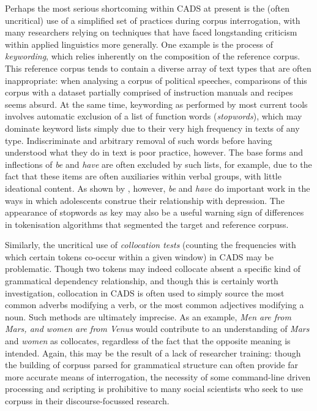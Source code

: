 Perhaps the most serious shortcoming within \gls{CADS} at present is the (often uncritical) use of a simplified set of practices during \gls{corpus} interrogation, with many researchers relying on techniques that have faced longstanding criticism within applied linguistics more generally. One example is the process of \emph{keywording}, which relies inherently on the composition of the reference \gls{corpus}. This reference \gls{corpus} tends to contain a diverse array of text types that are often inappropriate: when analysing a \gls{corpus} of political speeches, comparisons of this \gls{corpus} with a dataset partially comprised of instruction manuals and recipes seems absurd. At the same time, keywording as performed by most current tools involves automatic exclusion of a list of function words (\emph{stopwords}), which may dominate keyword lists simply due to their very high frequency in texts of any type. Indiscriminate and arbitrary removal of such words before having understood what they do in text is poor practice, however. The base forms and inflections of \emph{be} and \emph{have} are often excluded by such lists, for example, due to the fact that these items are often auxiliaries within verbal groups, with little ideational content. As shown by \textcite{harvey_disclosures_2012}, however, \emph{be} and \emph{have} do important work in the ways in which adolescents construe their relationship with depression. The appearance of stopwords as key may also be a useful warning sign of differences in tokenisation algorithms that segmented the target and reference \glspl{corpus}.

Similarly, the uncritical use of \emph{collocation tests} (counting the frequencies with which certain tokens co\hyp{}occur within a given window) in \gls{CADS} may be problematic. Though two tokens may indeed collocate absent a specific kind of grammatical dependency relationship, and though this is certainly worth investigation, collocation in \gls{CADS} is often used to simply source the most common adverbs modifying a verb, or the most common adjectives modifying a noun. Such methods are ultimately imprecise. As an example, \emph{Men are from Mars, and women are from Venus} would contribute to an understanding of \emph{Mars} and \emph{women} as collocates, regardless of the fact that the opposite meaning is intended. Again, this may be the result of a lack of researcher training: though the building of \glspl{corpus} parsed for grammatical structure can often provide far more accurate means of interrogation, the necessity of some command\hyp{}line driven processing and scripting is prohibitive to many social scientists who seek to use \glspl{corpus} in their discourse\hyp{}focussed research. 

